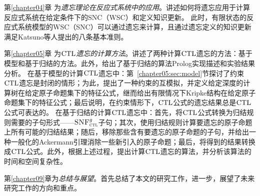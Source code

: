 第\ref{chapter04}章 为{\em 遗忘理论在反应式系统中的应用}。讲述如何将遗忘应用于计算反应式系统在给定条件下的SNC（WSC）和定义知识更新。
此时，有限状态的反应式系统模型的WSC（SNC）可以通过遗忘来计算，且通过遗忘定义的知识更新满足Katsuno等人提出的八条基本准则。


第\ref{chapter05}章 为{\em $\textrm{CTL}$遗忘的计算方法}。讲述了两种计算$\textrm{CTL}$遗忘的方法：基于模型和基于归结的方法。此外，给出了基于归结的算法Prolog实现描述和实验结果分析。
在基于模型的计算$\textrm{CTL}$遗忘中：第~\ref{chapter05:sec:model}节探讨了约束$\textrm{CTL}$遗忘是封闭的情形；为此，提出了一种约束的互模拟，并定义给定深度的计算树在给定原子命题集下的特征公式，继而给出有限情况下Kripke结构在给定原子命题集下的特征公式；最后说明，在约束情形下，$\textrm{CTL}$公式的遗忘结果总是$\textrm{CTL}$公式可表达的。
在基于归结的计算$\textrm{CTL}$遗忘中：首先，将$\textrm{CTL}$公式转换为归结规则需要的子句形式——${\textsc{SNF}_{\textsc{ctl}}^g}$子句；其次，使用归结规则计算要遗忘的原子命题上所有可能的归结结果；随后，移除那些含有要遗忘的原子命题的子句，并给出一种一般化的Ackermann引理消除一些新引入的原子命题；最后，将得到的结果转换成$\textrm{CTL}$公式。此外，根据上述过程，提出计算$\textrm{CTL}$遗忘的算法，并分析该算法的时间和空间复杂性。













第\ref{chapter09}章为\textit{总结与展望}。首先总结了本文的研究工作，进一步，展望了未来研究工作的方向和重点。
